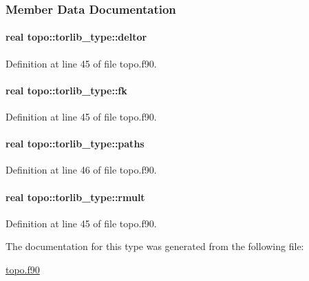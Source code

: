 \subsubsection{Member Data Documentation}
\hypertarget{structtopo_1_1torlib__type_ade9d0d27a7729316f39afadabd33a209}{
\paragraph[{deltor}]{\setlength{\rightskip}{0pt plus 5cm}real topo\-::torlib\-\_\-type\-::deltor}}\label{structtopo_1_1torlib__type_ade9d0d27a7729316f39afadabd33a209}


Definition at line 45 of file topo.\-f90.

\hypertarget{structtopo_1_1torlib__type_a39792c4241ecf5083ebab9c42b77300a}{
\paragraph[{fk}]{\setlength{\rightskip}{0pt plus 5cm}real topo\-::torlib\-\_\-type\-::fk}}\label{structtopo_1_1torlib__type_a39792c4241ecf5083ebab9c42b77300a}


Definition at line 45 of file topo.\-f90.

\hypertarget{structtopo_1_1torlib__type_a9cf20e6f9aed101cf320621449383017}{
\paragraph[{paths}]{\setlength{\rightskip}{0pt plus 5cm}real topo\-::torlib\-\_\-type\-::paths}}\label{structtopo_1_1torlib__type_a9cf20e6f9aed101cf320621449383017}


Definition at line 46 of file topo.\-f90.

\hypertarget{structtopo_1_1torlib__type_a9d32d992b83508a26d9e73619461fbf4}{
\paragraph[{rmult}]{\setlength{\rightskip}{0pt plus 5cm}real topo\-::torlib\-\_\-type\-::rmult}}\label{structtopo_1_1torlib__type_a9d32d992b83508a26d9e73619461fbf4}


Definition at line 45 of file topo.\-f90.



The documentation for this type was generated from the following file\-:\begin{DoxyCompactItemize}
\item 
\hyperlink{topo_8f90}{topo.\-f90}\end{DoxyCompactItemize}
